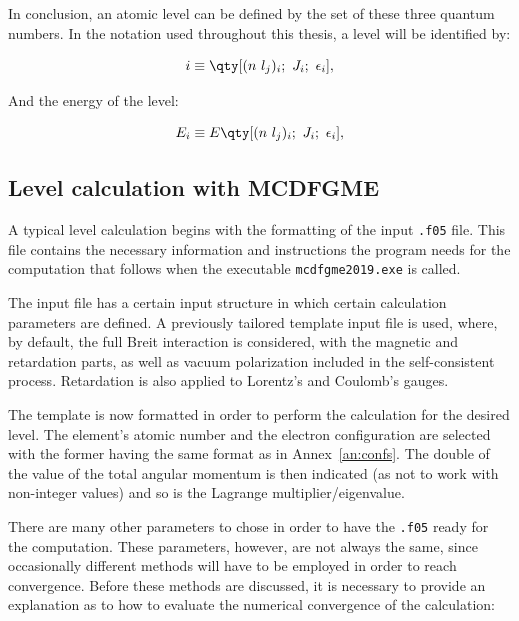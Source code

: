 In conclusion, an atomic level can be defined by the set of these three quantum numbers. In the notation used throughout this thesis, a level will be identified by:

\begin{equation}
    i\equiv \qty[(n\ l_j)_i;\ J_i;\ \epsilon_i],
\end{equation}

And the energy of the level:

\begin{equation}
    E_i\equiv E \qty[(n\ l_j)_i;\ J_i;\ \epsilon_i],
\end{equation}



\subsection{Level calculation with \gls{MCDFGME}}

A typical level calculation begins with the formatting of the input \verb|.f05| file. This file contains the necessary information and instructions the program needs for the computation that follows when the executable \verb|mcdfgme2019.exe| is called.

The input file has a certain input structure in which certain calculation parameters are defined. A previously tailored template input file is used, where, by default, the full Breit interaction is considered, with the magnetic and retardation parts, as well as vacuum polarization  included in the self-consistent process. Retardation is also applied to Lorentz's and Coulomb's gauges.

The template is now formatted in order to perform the calculation for the desired level. The element's atomic number and the electron configuration are selected with the former having the same format as in Annex~\ref{an:confs}. The double of the value of the  total angular momentum is then indicated (as not to work with non-integer values) and so is the Lagrange multiplier/eigenvalue.

There are many other parameters to chose in order to have the \verb|.f05| ready for the computation. These parameters, however, are not always the same, since occasionally different methods will have to be employed in order to reach convergence. Before these methods are discussed, it is necessary to provide an explanation as to how to evaluate the numerical convergence of the calculation:

